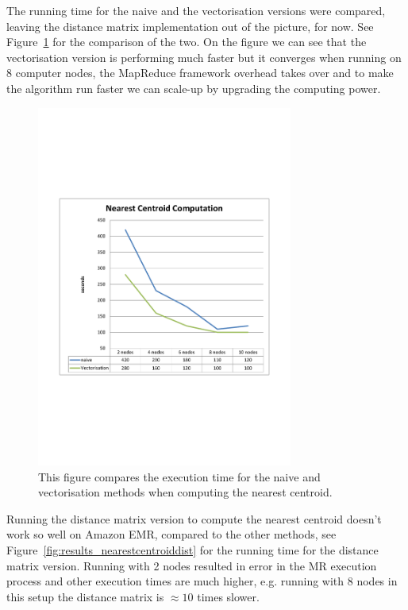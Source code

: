 The running time for the naive and the vectorisation versions were compared, leaving the distance matrix implementation out of the picture, for now. See Figure~\ref{fig:results_nearestcentroid} for the comparison of the two. On the figure we can see that the vectorisation version is performing much faster but it converges when running on 8 computer nodes, the MapReduce framework overhead takes over and to make the algorithm run faster we can scale-up by upgrading the computing power.

\begin{figure}[ht]
\centering
\includegraphics[trim = 10mm 70mm 10mm 70mm, clip, width=0.75\textwidth]{Figures/experiments/nearestcentroid.pdf}
\caption{This figure compares the execution time for the naive and vectorisation methods when computing the nearest centroid.  }
\label{fig:results_nearestcentroid}
\end{figure}

Running the distance matrix version to compute the nearest centroid doesn't work so well on Amazon EMR, compared to the other methods, see Figure~\ref{fig:results_nearestcentroiddist} for the running time for the distance matrix version. Running with 2 nodes resulted in error in the MR execution process and other execution times are much higher, e.g. running with 8 nodes in this setup the distance matrix is $\approx 10$ times slower.

